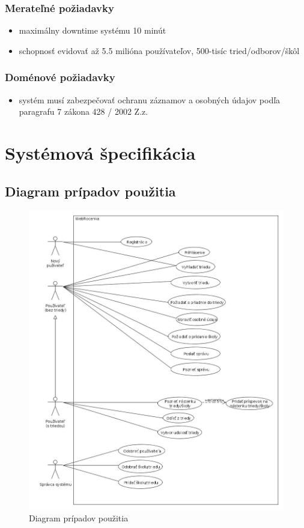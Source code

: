 \documentclass[slovak, 12pt, Times New Roman]{article}
\begin{document}
			\subsubsection{Merateľné požiadavky}
				\begin{itemize} \itemsep0pt \parskip0pt 
					\item maximálny downtime systému 10 minút
					\item schopnosť evidovať až 5.5 milióna používateľov, 500-tisíc tried/odborov/škôl
				\end{itemize}
			\subsubsection{Doménové požiadavky}
				\begin{itemize} \itemsep0pt \parskip0pt 
					\item systém musí zabezpečovať ochranu záznamov a osobných údajov podľa paragrafu 7 zákona 428 / 2002
							Z.z.
				\end{itemize}
				\clearpage
	\section{Systémová špecifikácia}
		\subsection{Diagram prípadov použitia}
			\begin{figure}[!htb]
				\centering
				\includegraphics[scale=0.35]{useCaseBasic.jpg}
				\caption{Diagram prípadov použitia}
				\label{fig:Reinforcement}
			\end{figure}
		\clearpage
\end{document}
